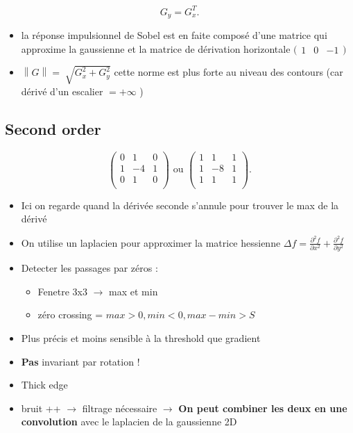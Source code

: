 \documentclass{article}
\theoremstyle{plain}%
\theoremstyle{definition}
\theoremstyle{remark}
\begin{document}
\[
    G_y = G_x^T
.\]


\begin{itemize}
    \item la réponse impulsionnel de Sobel est en faite composé d'une matrice qui approxime la gaussienne et la matrice de dérivation horizontale $ \big(\begin{smallmatrix}
        1 & 0 & -1
    \end{smallmatrix}\big) $ 
    \item $ \left\| G \right\| = \sqrt[]{G_x^2 + G_y^2} $ cette norme est plus forte au niveau des contours (car dérivé d'un escalier $ = + \infty  $ )
\end{itemize}


\subsection{Second order}

\[
    \begin{pmatrix}
        0 & 1 & 0 \\
        1 & -4 & 1 \\
        0 & 1 & 0 \\
    \end{pmatrix} \text{ ou } \begin{pmatrix}
        1 & 1 & 1 \\
        1 & -8 & 1 \\
        1 & 1 & 1 \\
    \end{pmatrix}
.\]
\begin{itemize}
    \item Ici on regarde quand la dérivée seconde s'annule pour trouver le max de la dérivé
    \item On utilise un laplacien pour approximer la matrice hessienne $ \Delta f = \frac{\partial ^2 f}{\partial x^2} + \frac{\partial ^2f}{\partial y^2} $ 
    \item Detecter les passages par zéros : \begin{itemize}
        \item Fenetre 3x3 $\rightarrow$ max et min
        \item zéro crossing = $max > 0, min < 0, max - min > S$
    \end{itemize}
    \item Plus précis et moins sensible à la threshold que gradient
    \item \textbf{Pas} invariant par rotation ! 
    \item Thick edge
    \item bruit ++ $\rightarrow$ filtrage nécessaire $\rightarrow$ \textbf{On peut combiner les deux en une convolution} avec le laplacien de la gaussienne 2D
\end{itemize}
\end{document}
